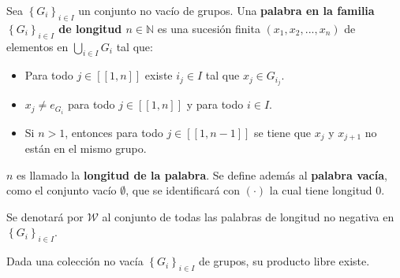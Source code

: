 \documentclass[12pt]{report}
\theoremstyle{largebreak}
\newcommand\natint[1]{\ensuremath{\left[\!\left[ #1\right]\!\right]}}
\begin{document}
    \begin{mydef}
        Sea $\left\{ G_i \right\}_{ i\in I}$ un conjunto no vacío de grupos. Una \textbf{palabra en la familia $\left\{ G_i \right\}_{ i\in I}$ de longitud $n\in\mathbb{N}$} es una sucesión finita $(x_1,x_2,...,x_n)$ de elementos en $\bigcup_{ i\in I}G_i$ tal que:
        \begin{itemize}
            \item Para todo $j\in\natint{1,n}$ existe $i_j\in I$ tal que $x_j\in G_{ i_j}$.
            \item $x_j\neq e_{ G_i}$ para todo $j\in\natint{1,n}$ y para todo $i\in I$.
            \item Si $n>1$, entonces para todo $j\in\natint{1,n-1}$ se tiene que $x_j$ y $x_{ j+1}$ no están en el mismo grupo.
        \end{itemize}
        $n$ es llamado la \textbf{longitud de la palabra}. Se define además al \textbf{palabra vacía}, como el conjunto vacío $\emptyset$, que se identificará con $(\cdot)$ la cual tiene longitud 0.

        Se denotará por $\mathscr{W}$ al conjunto de todas las palabras de longitud no negativa en $\left\{G_i \right\}_{ i\in I}$.
    \end{mydef}

    \begin{theor}
        Dada una colección no vacía $\left\{ G_i \right\}_{ i\in I}$ de grupos, su producto libre existe.
    \end{theor}
    
\end{document}
